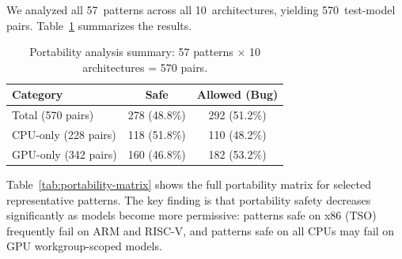 \documentclass[10pt]{article}
\begin{document}
We analyzed all 57~patterns across all 10~architectures, yielding
570~test-model pairs. Table~\ref{tab:portability-summary} summarizes the results.

\begin{table}[h]
\centering
\caption{Portability analysis summary: 57 patterns $\times$ 10 architectures = 570 pairs.}
\label{tab:portability-summary}
\begin{tabular}{lcc}
\toprule
\textbf{Category} & \textbf{Safe} & \textbf{Allowed (Bug)} \\
\midrule
Total (570 pairs) & 278 (48.8\%) & 292 (51.2\%) \\
\midrule
CPU-only (228 pairs) & 118 (51.8\%) & 110 (48.2\%) \\
GPU-only (342 pairs) & 160 (46.8\%) & 182 (53.2\%) \\
\bottomrule
\end{tabular}
\end{table}

Table~\ref{tab:portability-matrix} shows the full portability matrix for
selected representative patterns.  The key finding is that portability
safety decreases significantly as models become more permissive: patterns
safe on x86 (TSO) frequently fail on ARM and RISC-V, and patterns safe
on all CPUs may fail on GPU workgroup-scoped models.
\end{document}
